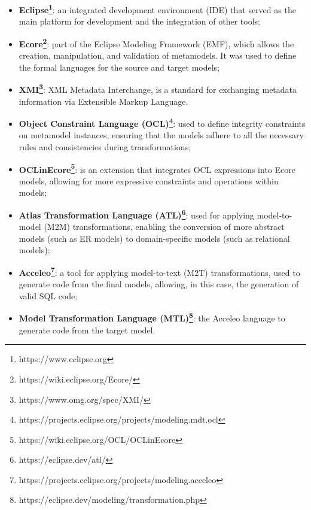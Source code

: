 \documentclass[10pt]{article}
\begin{document}
\begin{itemize}

    \item \textbf{Eclipse\footnote{https://www.eclipse.org}}: an integrated development environment (IDE) that served as the main platform for development and the integration of other tools;
    
    \item \textbf{Ecore\footnote{https://wiki.eclipse.org/Ecore/}}: part of the Eclipse Modeling Framework (EMF), which allows the creation, manipulation, and validation of metamodels. It was used to define the formal languages for the source and target models;

    \item \textbf{XMI\footnote{https://www.omg.org/spec/XMI/}}: XML Metadata Interchange, is a standard for exchanging metadata information via Extensible Markup Language.

    \item \textbf{Object Constraint Language (OCL)\footnote{https://projects.eclipse.org/projects/modeling.mdt.ocl}}: used to define integrity constraints on metamodel instances, ensuring that the models adhere to all the necessary rules and consistencies during transformations;
    
    \item \textbf{OCLinEcore\footnote{https://wiki.eclipse.org/OCL/OCLinEcore}}: is an extension that integrates OCL expressions into Ecore models, allowing for more expressive constraints and operations within models;
    
    \item \textbf{Atlas Transformation Language (ATL)\footnote{https://eclipse.dev/atl/}}: used for applying model-to-model (M2M) transformations, enabling the conversion of more abstract models (such as ER models) to domain-specific models (such as relational models);
    
    \item \textbf{Acceleo\footnote{https://projects.eclipse.org/projects/modeling.acceleo}}: a tool for applying model-to-text (M2T) transformations, used to generate code from the final models, allowing, in this case, the generation of valid SQL code;

    \item \textbf{Model Transformation Language (MTL)\footnote{https://eclipse.dev/modeling/transformation.php}}: the Acceleo language to generate code from the target model.
    
\end{itemize}
\end{document}
